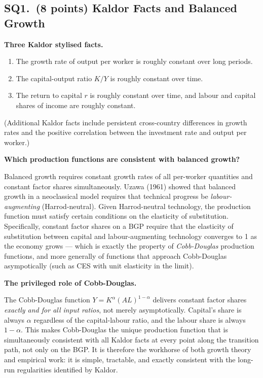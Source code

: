 \documentclass[a4paper,11pt]{article}
\begin{document}
\subsection*{SQ1.\ (8 points) Kaldor Facts and Balanced Growth}

\begin{answerbox}
\textbf{Three Kaldor stylised facts.}

\begin{enumerate}[label=(\roman*), itemsep=3pt]
    \item The growth rate of output per worker is roughly constant over long periods.
    \item The capital-output ratio $K/Y$ is roughly constant over time.
    \item The return to capital $r$ is roughly constant over time, and labour and capital
    shares of income are roughly constant.
\end{enumerate}
(Additional Kaldor facts include persistent cross-country differences in growth rates and
the positive correlation between the investment rate and output per worker.)

\textbf{Which production functions are consistent with balanced growth?}

Balanced growth requires constant growth rates of all per-worker quantities and constant
factor shares simultaneously. Uzawa (1961) showed that balanced growth in a
neoclassical model requires that technical progress be \emph{labour-augmenting}
(Harrod-neutral). Given Harrod-neutral technology, the production function must satisfy
certain conditions on the elasticity of substitution. Specifically, constant factor
shares on a BGP require that the elasticity of substitution between capital and
labour-augmenting technology converges to 1 as the economy grows --- which is exactly the
property of \emph{Cobb-Douglas} production functions, and more generally of functions
that approach Cobb-Douglas asympotically (such as CES with unit elasticity in the limit).

\textbf{The privileged role of Cobb-Douglas.}

The Cobb-Douglas function $Y = K^{\alpha}(AL)^{1-\alpha}$ delivers constant factor
shares \emph{exactly and for all input ratios}, not merely asymptotically. Capital's
share is always $\alpha$ regardless of the capital-labour ratio, and the labour share is
always $1-\alpha$. This makes Cobb-Douglas the unique production function that is
simultaneously consistent with all Kaldor facts at every point along the transition path,
not only on the BGP. It is therefore the workhorse of both growth theory and empirical
work: it is simple, tractable, and exactly consistent with the long-run regularities
identified by Kaldor.
\end{answerbox}
\end{document}

